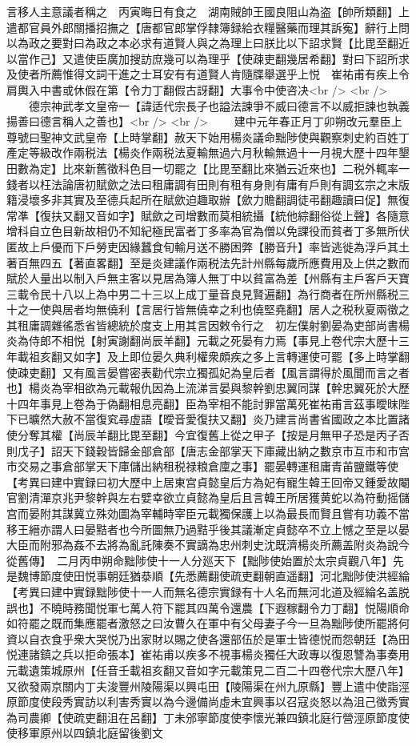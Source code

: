 言移人主意議者稱之　丙寅晦日有食之　湖南賊帥王國良阻山為盗【帥所類翻】上遣都官員外郎關播招撫之【唐都官郎掌俘隸簿録給衣糧醫藥而理其訴寃】辭行上問以為政之要對曰為政之本必求有道賢人與之為理上曰朕比以下詔求賢【比毘至翻近以當作己】又遣使臣廣加搜訪庶幾可以為理乎【使疎吏翻幾居希翻】對曰下詔所求及使者所薦惟得文詞干進之士耳安有有道賢人肯隨牒舉選乎上悦　崔祐甫有疾上令肩輿入中書或休假在第【令力丁翻假古訝翻】大事令中使咨决<br />
<br />
　　德宗神武孝文皇帝一【諱适代宗長子也謚法諫爭不威曰德言不以威拒諫也執義揚善曰德言稱人之善也】<br />
<br />
　　建中元年春正月丁卯朔改元羣臣上尊號曰聖神文武皇帝【上時掌翻】赦天下始用楊炎議命黜陟使與觀察刺史約百姓丁產定等級改作兩税法【楊炎作兩税法夏輸無過六月秋輸無過十一月視大歷十四年墾田數為定】比來新舊徵科色目一切罷之【比毘至翻比來猶云近來也】二税外輒率一錢者以枉法論唐初賦歛之法曰租庸調有田則有租有身則有庸有戶則有調玄宗之末版籍浸壞多非其實及至德兵起所在賦歛迫趣取辦【歛力贍翻調徒弔翻趣讀曰促】無復常凖【復扶又翻又音如字】賦歛之司增數而莫相統攝【統他綜翻俗從上聲】各隨意增科自立色目新故相仍不知紀極民富者丁多率為官為僧以免課役而貧者丁多無所伏匿故上戶優而下戶勞吏因緣蠶食旬輸月送不勝困弊【勝音升】率皆逃徙為浮戶其土著百無四五【著直畧翻】至是炎建議作兩税法先計州縣每歲所應費用及上供之數而賦於人量出以制入戶無主客以見居為簿人無丁中以貧富為差【州縣有主戶客戶天寶三載令民十八以上為中男二十三以上成丁量音良見賢遍翻】為行商者在所州縣税三十之一使與居者均無僥利【言居行皆無僥幸之利也僥堅堯翻】居人之税秋夏兩徵之其租庸調雜徭悉省皆總統於度支上用其言因敕令行之　初左僕射劉晏為吏部尚書楊炎為侍郎不相悦【射寅謝翻尚辰羊翻】元載之死晏有力焉【事見上卷代宗大歷十三年載祖亥翻又如字】及上即位晏久典利權衆頗疾之多上言轉運使可罷【多上時掌翻使疎吏翻】又有風言晏嘗密表勸代宗立獨孤妃為皇后者【風言謂得於風聞而言之者也】楊炎為宰相欲為元載報仇因為上流涕言晏與黎幹劉忠翼同謀【幹忠翼死於大歷十四年事見上卷為于偽翻相息亮翻】臣為宰相不能討罪當萬死崔祐甫言茲事曖昩陛下已曠然大赦不當復䆒尋虛語【曖音愛復扶又翻】炎乃建言尚書省國政之本比置諸使分奪其權【尚辰羊翻比毘至翻】今宜復舊上從之甲子【按是月無甲子恐是丙子否則戊子】詔天下錢穀皆歸金部倉部【唐志金部掌天下庫藏出納之數京市互市和市宫市交易之事倉部掌天下庫儲出納租税禄粮倉廩之事】罷晏轉運租庸青苖鹽鐵等使　【考異曰建中實録曰初大歷中上居東宫貞懿皇后方為妃有寵生韓王回帝又鍾愛故閹官劉清潬京兆尹黎幹與左右嬖幸欲立貞懿為皇后且言韓王所居獲黄蛇以為符動摇儲宫而晏附其謀冀立殊効圖為宰輔時宰臣元載獨保護上以為最長而賢且嘗有功義不當移王縉亦謂人曰晏黠者也今所圖無乃過黠乎後其議漸定貞懿卒不立上憾之至是以晏大臣而附邪為姦不去將為亂託陳奏不實謫為忠州刺史沈既濟楊炎所薦盖附炎為說今從舊傳】　二月丙申朔命黜陟使十一人分廵天下【黜陟使始置於太宗貞觀八年】先是魏博節度使田悦事朝廷猶㳟順【先悉薦翻使疏吏翻朝直遥翻】河北黜陟使洪經綸　【考異曰建中實録黜陟使十一人而無名德宗實録有十人名而無河北道及經綸名盖脱誤也】不曉時務聞悦軍七萬人符下罷其四萬令還農【下遐稼翻令力丁翻】悦陽順命如符罷之既而集應罷者激怒之曰汝曹久在軍中有父母妻子今一旦為黜陟使所罷將何資以自衣食乎衆大哭悦乃出家財以賜之使各還部伍於是軍士皆德悦而怨朝廷【為田悦連諸鎮之兵以拒命張本】崔祐甫以疾多不視事楊炎獨任大政專以復恩讐為事奏用元載遺策城原州【任音壬載祖亥翻又音如字元載策見二百二十四卷代宗大歷八年】又欲發兩京關内丁夫浚豐州陵陽渠以興屯田【陵陽渠在州九原縣】豐上遣中使詣涇原節度使段秀實訪以利害秀實以為今邊備尚虛未宜興事以召寇炎怒以為沮己徵秀實為司農卿【使疏吏翻沮在呂翻】丁未邠寧節度使李懷光兼四鎮北庭行營涇原節度使使移軍原州以四鎮北庭留後劉文